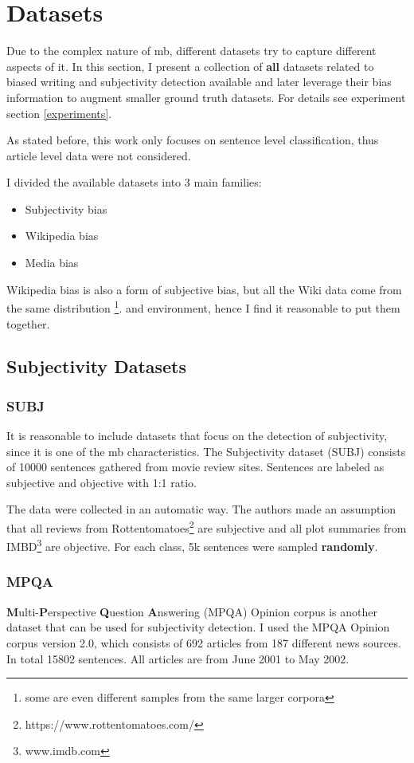 \chapter{Datasets} \label{datasets}
Due to the complex nature of \gls{mb}, different datasets try to capture different aspects of it. In this section, I present a collection of \textbf{all} datasets related to biased writing and subjectivity detection available and later leverage their bias information to augment smaller ground truth datasets. For details see experiment section \ref{experiments}.

As stated before, this work only focuses on sentence level classification, thus article level data were not considered.

I divided the available datasets into 3 main families: 
\begin{itemize}
    \item Subjectivity bias
    \item Wikipedia bias
    \item Media bias
\end{itemize}
Wikipedia bias is also a form of subjective bias, but all the Wiki data come from the same distribution \footnote{some are even different samples from the same larger corpora}. and environment, hence I find it reasonable to put them together.


\section{Subjectivity Datasets}

\subsection{SUBJ}
It is reasonable to include datasets that focus on the detection of subjectivity, since it is one of the \gls{mb} characteristics. The Subjectivity dataset (SUBJ) \cite{Pang+Lee:04a} consists of 10000 sentences gathered from movie review sites. Sentences are labeled as subjective and objective with 1:1 ratio. 

The data were collected in an automatic way. The authors made an assumption that all reviews from Rottentomatoes\footnote{https://www.rottentomatoes.com/} are subjective and all plot summaries from IMBD\footnote{ www.imdb.com} are objective. For each class, 5k sentences were sampled \textbf{randomly}.




\subsection{MPQA}
\textbf{M}ulti-\textbf{P}erspective \textbf{Q}uestion \textbf{A}nswering (MPQA) Opinion corpus is another dataset that can be used for subjectivity detection. I used the MPQA Opinion corpus version 2.0, which consists of 692 articles from 187 different news sources. In total 15802 sentences. All articles are from June 2001 to May 2002.

